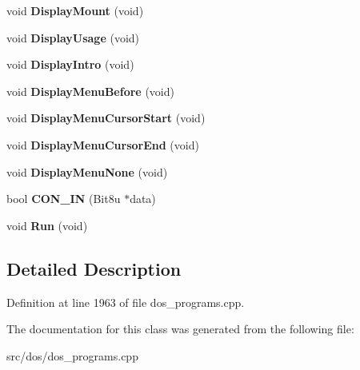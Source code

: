 \begin{DoxyCompactItemize}
\item 
\hypertarget{classINTRO_a5c6e294e686b9c667e58bd2ca8e13bb4}{void {\bfseries Display\-Mount} (void)}\label{classINTRO_a5c6e294e686b9c667e58bd2ca8e13bb4}

\item 
\hypertarget{classINTRO_a4857619c9d351417a9a8c87b29bed52c}{void {\bfseries Display\-Usage} (void)}\label{classINTRO_a4857619c9d351417a9a8c87b29bed52c}

\item 
\hypertarget{classINTRO_a3e68c8cde2fce914c656154f273f7149}{void {\bfseries Display\-Intro} (void)}\label{classINTRO_a3e68c8cde2fce914c656154f273f7149}

\item 
\hypertarget{classINTRO_a0c242eac779e67c6168613e6b2a81290}{void {\bfseries Display\-Menu\-Before} (void)}\label{classINTRO_a0c242eac779e67c6168613e6b2a81290}

\item 
\hypertarget{classINTRO_a53f19e5f292278bcd847a8a44b0bdc5d}{void {\bfseries Display\-Menu\-Cursor\-Start} (void)}\label{classINTRO_a53f19e5f292278bcd847a8a44b0bdc5d}

\item 
\hypertarget{classINTRO_a3ed7b89911f2fbd3f0b5a8412d9d91c5}{void {\bfseries Display\-Menu\-Cursor\-End} (void)}\label{classINTRO_a3ed7b89911f2fbd3f0b5a8412d9d91c5}

\item 
\hypertarget{classINTRO_a83e703c1fe7702783fbd1ce1320235a6}{void {\bfseries Display\-Menu\-None} (void)}\label{classINTRO_a83e703c1fe7702783fbd1ce1320235a6}

\item 
\hypertarget{classINTRO_ab717779f33410fb437dfb3b82fcf8e65}{bool {\bfseries C\-O\-N\-\_\-\-I\-N} (Bit8u $\ast$data)}\label{classINTRO_ab717779f33410fb437dfb3b82fcf8e65}

\item 
\hypertarget{classINTRO_a7fe083b2cab4fe79e280b030cc542fd3}{void {\bfseries Run} (void)}\label{classINTRO_a7fe083b2cab4fe79e280b030cc542fd3}

\end{DoxyCompactItemize}


\subsection{Detailed Description}


Definition at line 1963 of file dos\-\_\-programs.\-cpp.



The documentation for this class was generated from the following file\-:\begin{DoxyCompactItemize}
\item 
src/dos/dos\-\_\-programs.\-cpp\end{DoxyCompactItemize}
